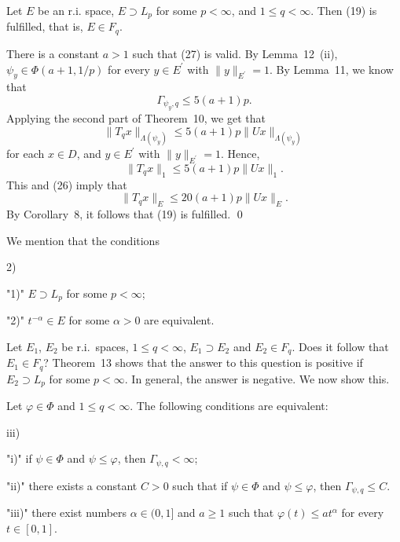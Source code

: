  Let $E$ be an r.i. space, $E\supset L_p$ for
some $p < \infty$, and $1\leq q < \infty$. Then (19) is fulfilled, that
is,
$E\in F_q$.
\endproclaim

There is a constant $a > 1$ such that (27) is valid.
By Lemma~12~(ii), $\psi_y \in \Phi(a+1,1/ p)$ for every
$y\in E^\prime$ with $\|y\|_{E^\prime} = 1$. By Lemma~11, we
know that
$$
\Gamma_{\psi_y,q} \leq 5(a +1) p.
$$
Applying the second part of Theorem~10, we get that
$$
\|T_q x\|_{\Lambda (\psi_y)}\leq 5(a+1) p \|U x\| _{\Lambda(\psi_y)}
$$
for each $x\in D$, and $y\in E^\prime$ with $\|y\|_{E^\prime} = 1$. Hence,
$$
\|T_q x\|_1 \leq 5(a+1) p\|U x\|_1.
$$
This and (26) imply that
$$
\|T_q x\|_E \leq 20 (a+1) p\|U x\|_E.
$$
By Corollary~8, it follows that (19) is fulfilled.
\qed
\enddemo

We mention that the conditions
\roster\widestnumber\item{2)}
\item"{1)}" $E\supset L_p$ for some $p <\infty$;
\item"{2)}" $t^{-\alpha} \in E$ for some $\alpha >0$
\endroster
are equivalent.

\bigskip

Let $E_1$, $E_2$ be r.i.\ spaces, $1\leq q < \infty$,
$E_1\supset E_2$ and $E_2 \in F_q$. Does it follow that $E_1 \in F_q$?
Theorem~13 shows that the answer to this question is positive
if $E_2 \supset L_p$ for some $p < \infty$. In general, the
answer is negative. We now show this.

 Let $\varphi\in\Phi$ and $1\leq q < \infty$. The
following conditions are equivalent:
\roster\widestnumber\item{iii)}
\item"{i)}" if $\psi \in \Phi$ and $\psi\leq \varphi$, then
$\Gamma_{\psi,q} <\infty$;
\item"{ii)}" there exists a constant $C>0$ such that if $\psi\in\Phi$ and
$\psi\leq\varphi$, then $\Gamma_{\psi,q} \leq C$.
\item"{iii)}" there exist numbers $\alpha\in (0,1]$ and $a\geq 1$ such
that $\varphi (t) \leq a t^\alpha$ for every $t\in [0,1]$.
\endroster
\endproclaim

